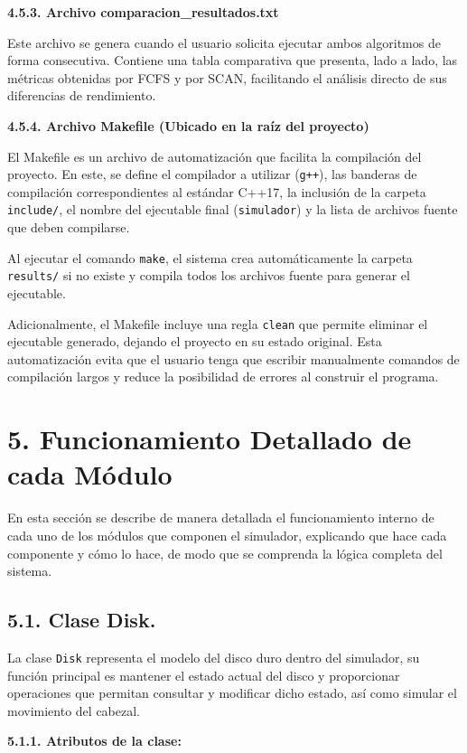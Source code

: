\documentclass[14pt,letterpaper]{extarticle}
\begin{document}
\textbf{4.5.3. Archivo comparacion\_resultados.txt}

Este archivo se genera cuando el usuario solicita ejecutar ambos algoritmos de forma consecutiva. Contiene una tabla comparativa que presenta, lado a lado, las métricas obtenidas por FCFS y por SCAN, facilitando el análisis directo de sus diferencias de rendimiento.

\textbf{4.5.4. Archivo Makefile (Ubicado en la raíz del proyecto)}

El Makefile es un archivo de automatización que facilita la compilación del proyecto. En este, se define el compilador a utilizar (\texttt{g++}), las banderas de compilación correspondientes al estándar C++17, la inclusión de la carpeta \texttt{include/}, el nombre del ejecutable final (\texttt{simulador}) y la lista de archivos fuente que deben compilarse.

Al ejecutar el comando \texttt{make}, el sistema crea automáticamente la carpeta \texttt{results/} si no existe y compila todos los archivos fuente para generar el ejecutable.

Adicionalmente, el Makefile incluye una regla \texttt{clean} que permite eliminar el ejecutable generado, dejando el proyecto en su estado original. Esta automatización evita que el usuario tenga que escribir manualmente comandos de compilación largos y reduce la posibilidad de errores al construir el programa.

\section*{5. Funcionamiento Detallado de cada Módulo}

En esta sección se describe de manera detallada el funcionamiento interno de cada uno de los módulos que componen el simulador, explicando que hace cada componente y cómo lo hace, de modo que se comprenda la lógica completa del sistema.

\subsection*{5.1. Clase Disk.}

La clase \texttt{Disk} representa el modelo del disco duro dentro del simulador, su función principal es mantener el estado actual del disco y proporcionar operaciones que permitan consultar y modificar dicho estado, así como simular el movimiento del cabezal.

\textbf{5.1.1. Atributos de la clase:}
\end{document}
